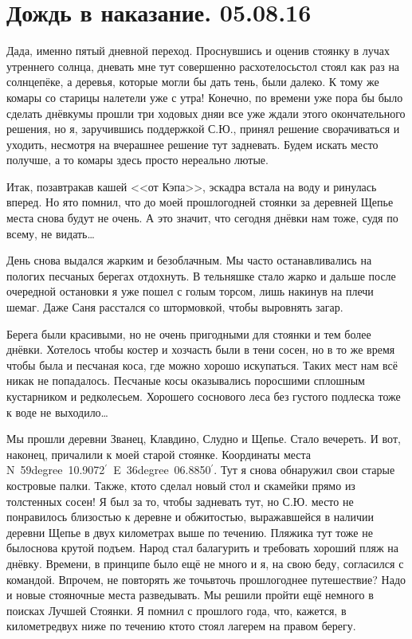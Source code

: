 \chapter{Дождь в наказание. 05.08.16} 

Да\sdash да, именно пятый дневной переход. Проснувшись и оценив стоянку в лучах утреннего солнца, дневать мне тут совершенно расхотелось\mdash стол стоял как раз на солнцепёке, а деревья, которые могли бы дать тень, были далеко. К тому же комары со старицы налетели уже с утра! Конечно, по времени уже пора бы было сделать днёвку\mdash мы прошли три ходовых дня\mdash и все уже ждали этого окончательного решения, но я, заручившись поддержкой С.Ю., принял решение сворачиваться и уходить, несмотря на вчерашнее решение тут задневать. Будем искать место получше, а то комары здесь просто нереально лютые.

Итак, позавтракав кашей <<от Кэпа>>, эскадра встала на воду и ринулась вперед. Но я\sdash то помнил, что до моей прошлогодней стоянки за деревней Щепье места снова будут не очень. А это значит, что сегодня днёвки нам тоже, судя по всему, не видать\ldots 

День снова выдался жарким и безоблачным. Мы часто останавливались на пологих песчаных берегах отдохнуть. В тельняшке стало жарко и дальше после очередной остановки я уже пошел с голым торсом, лишь накинув на плечи шемаг. Даже Саня расстался со штормовкой, чтобы выровнять загар. 

Берега были красивыми, но не очень пригодными для стоянки и тем более днёвки. Хотелось чтобы костер и хозчасть были в тени сосен, но в то же время чтобы была и песчаная коса, где можно хорошо искупаться. Таких мест нам всё никак не попадалось. Песчаные косы оказывались поросшими сплошным кустарником и редколесьем. Хорошего соснового леса без густого подлеска тоже к воде не выходило\ldots 

Мы прошли деревни Званец, Клавдино, Слудно и Щепье. Стало вечереть. И вот, наконец, причалили к моей старой стоянке. Координаты места N~59degree~10.9072$^\prime$~E~36degree~06.8850$^\prime$. Тут я снова обнаружил свои старые костровые палки. Также, кто\sdash то сделал новый стол и скамейки прямо из толстенных сосен! Я был за то, чтобы задневать тут, но С.Ю. место не понравилось близостью к деревне и обжитостью, выражавшейся в наличии деревни Щепье в двух километрах выше по течению. Пляжика тут тоже не было\mdash снова крутой подъем. Народ стал балагурить и требовать хороший пляж на днёвку. Времени, в принципе было ещё не много и я, на свою беду, согласился с командой. Впрочем, не повторять же точь\sdash в\sdash точь прошлогоднее путешествие? Надо и новые стояночные места разведывать. Мы решили пройти ещё немного в поисках Лучшей Стоянки. Я помнил с прошлого года, что, кажется, в километре\sdash двух ниже по течению кто\sdash то стоял лагерем на правом берегу.

